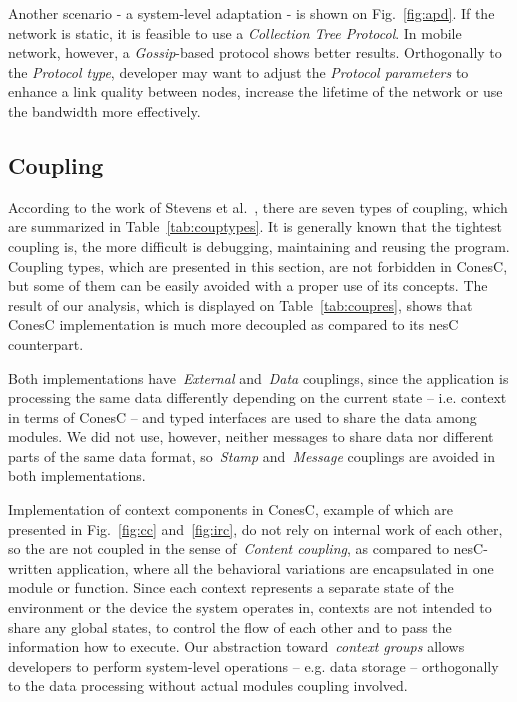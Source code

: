 Another scenario - a system-level adaptation - is shown on Fig.~\ref{fig:apd}.
If the network is static, it is feasible to use a \emph{Collection Tree
Protocol}. In mobile network, however, a \emph{Gossip}-based protocol shows
better results. Orthogonally to the \emph{Protocol type}, developer may want to
adjust the \emph{Protocol parameters} to enhance a link quality between nodes,
increase the lifetime of the network or use the bandwidth more effectively.


\subsection{Coupling}\label{sec:evalcomp}

According to the work of Stevens et al.~\cite{stevens79}, there are seven types
of coupling, which are summarized in Table~\ref{tab:couptypes}. It is generally
known that the tightest coupling is, the more difficult is debugging,
maintaining and reusing the program. Coupling types, which are presented in this section, are not forbidden in ConesC, but some of them can be easily avoided with a proper use of its concepts. The result of our analysis, which is displayed on Table~\ref{tab:coupres}, shows that ConesC
implementation is much more decoupled as compared to its nesC counterpart. 

Both implementations have~\emph{External} and~\emph{Data} couplings, since the application is processing the same data differently depending on the current state -- i.e. context in terms of ConesC -- and typed interfaces are used to share the data among modules. We did not use, however, neither messages to share data nor different parts of the same data format, so~\emph{Stamp} and~\emph{Message} couplings are avoided in both implementations.

Implementation of context components in ConesC, example of which are presented in Fig.~\ref{fig:cc} and~\ref{fig:irc}, do not rely on internal work of each other, so the are not coupled in the sense of~\emph{Content coupling}, as compared to nesC-written application, where all the behavioral variations are encapsulated in one module or function. Since each context represents a separate state of the environment or the device the system operates in, contexts are not intended to share any global states, to control the flow of each other and to pass the information how to execute. Our abstraction toward~\emph{context
groups} allows developers to perform system-level operations -- e.g. data storage --
orthogonally to the data processing without actual modules coupling involved.

